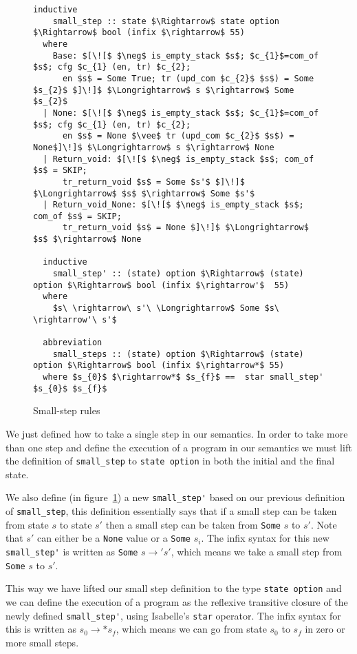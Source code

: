 \begin{figure}
  \begin{lstlisting}[frame=single, mathescape=true]
  inductive
    small_step :: state $\Rightarrow$ state option $\Rightarrow$ bool (infix $\rightarrow$ 55)
  where
    Base: $[\![$ $\neg$ is_empty_stack $s$; $c_{1}$=com_of $s$; cfg $c_{1} (en, tr) $c_{2};
      en $s$ = Some True; tr (upd_com $c_{2}$ $s$) = Some $s_{2}$ $]\!]$ $\Longrightarrow$ s $\rightarrow$ Some $s_{2}$
  | None: $[\![$ $\neg$ is_empty_stack $s$; $c_{1}$=com_of $s$; cfg $c_{1} (en, tr) $c_{2};
      en $s$ = None $\vee$ tr (upd_com $c_{2}$ $s$) = None$]\!]$ $\Longrightarrow$ s $\rightarrow$ None
  | Return_void: $[\![$ $\neg$ is_empty_stack $s$; com_of $s$ = SKIP;
      tr_return_void $s$ = Some $s'$ $]\!]$ $\Longrightarrow$ $s$ $\rightarrow$ Some $s'$
  | Return_void_None: $[\![$ $\neg$ is_empty_stack $s$; com_of $s$ = SKIP;
      tr_return_void $s$ = None $]\!]$ $\Longrightarrow$ $s$ $\rightarrow$ None

  inductive
    small_step' :: (state) option $\Rightarrow$ (state) option $\Rightarrow$ bool (infix $\rightarrow'$  55)
  where
    $s\ \rightarrow\ s'\ \Longrightarrow$ Some $s\ \rightarrow'\ s'$

  abbreviation
    small_steps :: (state) option $\Rightarrow$ (state) option $\Rightarrow$ bool (infix $\rightarrow*$ 55)
  where $s_{0}$ $\rightarrow*$ $s_{f}$ ==  star small_step' $s_{0}$ $s_{f}$
  \end{lstlisting}

  \caption{Small-step rules}
  \label{fig:small_step_rules}
\end{figure}

We just defined how to take a single step in our semantics.
In order to take more than one step and define the execution of a program in our semantics we must lift the definition of \verb|small_step| to \verb|state option| in both the initial and the final state.

We also define (in figure~\ref{fig:small_step_rules}) a new \verb|small_step'| based on our previous definition of \verb|small_step|, this definition essentially says that if a small step can be taken from state $s$ to state $s'$ then a small step can be taken from \verb|Some| $s$ to $s'$.
Note that $s'$ can either be a \verb|None| value or a \verb|Some| $s_{i}$.
The infix syntax for this new \verb|small_step'| is written as \verb|Some| $s \rightarrow' s'$, which means we take a small step from \verb|Some| $s$ to $s'$.

This way we have lifted our small step definition to the type \verb|state option| and we can define the execution of a program as the reflexive transitive closure of the newly defined \verb|small_step'|, using Isabelle's \verb|star| operator.
The infix syntax for this is written as $s_{0} \rightarrow* s_{f}$, which means we can go from state $s_{0}$ to $s_{f}$ in zero or more small steps.


